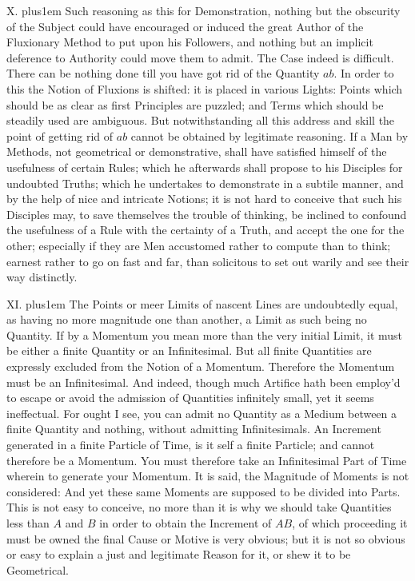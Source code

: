 \medbreak

X. \hskip 0pt plus1em
Such reasoning as this for Demonstration, nothing but the
obscurity of the Subject could have encouraged or induced the
great Author of the Fluxionary Method to put upon his Followers,
and nothing but an implicit deference to Authority could move
them to admit.  The Case indeed is difficult.  There can be
nothing done till you have got rid of the Quantity $ab$.  In
order to this the Notion of Fluxions is shifted: it is placed in
various Lights: Points which should be as clear as first
Principles are puzzled; and Terms which should be steadily used
are ambiguous.  But notwithstanding all this address and skill
the point of getting rid of $ab$ cannot be obtained by legitimate
reasoning.  If a Man by Methods, not geometrical or
demonstrative, shall have satisfied himself of the usefulness of
certain Rules; which he afterwards shall propose to his Disciples
for undoubted Truths; which he undertakes to demonstrate in a
subtile manner, and by the help of nice and intricate Notions; it
is not hard to conceive that such his Disciples may, to save
themselves the trouble of thinking, be inclined to confound the
usefulness of a Rule with the certainty of a Truth, and accept
the one for the other; especially if they are Men accustomed
rather to compute than to think; earnest rather to go on fast and
far, than solicitous to set out warily and see their way
distinctly.


\medbreak

XI. \hskip 0pt plus1em
The Points or meer Limits of nascent Lines are undoubtedly equal,
as having no more magnitude one than another, a Limit as such
being no Quantity.  If by a Momentum you mean more than the very
initial Limit, it must be either a finite Quantity or an
Infinitesimal.  But all finite Quantities are expressly excluded
from the Notion of a Momentum.  Therefore the Momentum must be an
Infinitesimal.  And indeed, though much Artifice hath been
employ'd to escape or avoid the admission of Quantities
infinitely small, yet it seems ineffectual.  For ought I see, you
can admit no Quantity as a Medium between a finite Quantity and
nothing, without admitting Infinitesimals.  An Increment
generated in a finite Particle of Time, is it self a finite
Particle; and cannot therefore be a Momentum.  You must therefore
take an Infinitesimal Part of Time wherein to generate your
Momentum.  It is said, the Magnitude of Moments is not
considered:  And yet these same Moments are supposed to be
divided into Parts.  This is not easy to conceive, no more than
it is why we should take Quantities less than $A$ and $B$ in
order to obtain the Increment of $AB$, of which proceeding it
must be owned the final Cause or Motive is very obvious; but it
is not so obvious or easy to explain a just and legitimate Reason
for it, or shew it to be Geometrical.

